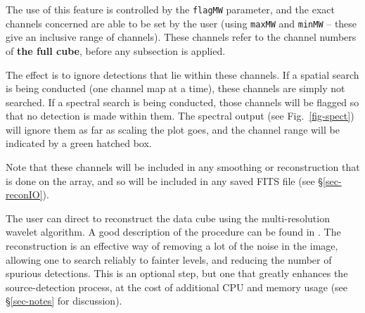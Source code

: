The use of this feature is controlled by the \texttt{flagMW}
parameter, and the exact channels concerned are able to be set by the
user (using \texttt{maxMW} and \texttt{minMW} -- these give an
inclusive range of channels). These channels refer to the channel
numbers of \textbf{the full cube}, before any subsection is applied.

The effect is to ignore detections that lie within these channels. If
a spatial search is being conducted (\ie one channel map at a time),
these channels are simply not searched. If a spectral search is being
conducted, those channels will be flagged so that no detection is made
within them. The spectral output (see Fig.~\ref{fig-spect}) will
ignore them as far as scaling the plot goes, and the channel range
will be indicated by a green hatched box.

Note that these channels will be included in any smoothing or
reconstruction that is done on the array, and so will be included in
any saved FITS file (see \S\ref{sec-reconIO}).

\label{sec-recon}

The user can direct \duchamp to reconstruct the data cube using the
multi-resolution \atrous wavelet algorithm. A good description of the
procedure can be found in \citet{starck02a}. The reconstruction is an
effective way of removing a lot of the noise in the image, allowing
one to search reliably to fainter levels, and reducing the number of
spurious detections. This is an optional step, but one that greatly
enhances the source-detection process, at the cost of additional CPU
and memory usage (see \S\ref{sec-notes} for discussion).


